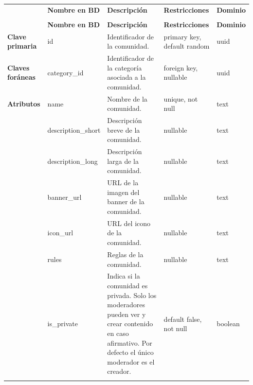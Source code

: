 \begin{longtable}{|
>{\raggedright\arraybackslash}p{1.9cm}|
>{\raggedright\arraybackslash}p{2.7cm}|
>{\raggedright\arraybackslash}p{4.9cm}|
>{\raggedright\arraybackslash}p{2.7cm}|
>{\raggedright\arraybackslash}p{2.1cm}|
}
\hline

\rowcolor[gray]{0.75}
\multicolumn{5}{|c|}{\textbf{Comunidades}} \\
\hline

 & \textbf{Nombre en BD} & \textbf{Descripción} & \textbf{Restricciones} & \textbf{Dominio} \\
\hline
\endfirsthead

\hline
\rowcolor[gray]{0.75}
\multicolumn{5}{|c|}{\textbf{Comunidades}} \\
\hline

 & \textbf{Nombre en BD} & \textbf{Descripción} & \textbf{Restricciones} & \textbf{Dominio} \\
\hline
\endhead

\textbf{Clave primaria}
& id
& Identificador de la comunidad.
& primary key, default random
& uuid \\
\hline

\textbf{Claves foráneas}
& category\_\allowbreak id
& Identificador de la categoría asociada a la comunidad.
& foreign key, nullable
& uuid \\
\hline

\textbf{Atributos}
& name
& Nombre de la comunidad.
& unique, not null
& text \\
\cline{2-5}

& description\_\allowbreak short
& Descripción breve de la comunidad.
& nullable
& text \\
\cline{2-5}

& description\_\allowbreak long
& Descripción larga de la comunidad.
& nullable
& text \\
\cline{2-5}

& banner\_\allowbreak url
& URL de la imagen del banner de la comunidad.
& nullable
& text \\
\cline{2-5}

& icon\_\allowbreak url
& URL del icono de la comunidad.
& nullable
& text \\
\cline{2-5}

& rules
& Reglas de la comunidad.
& nullable
& text \\
\cline{2-5}

& is\_\allowbreak private
& Indica si la comunidad es privada. Solo los moderadores pueden ver y crear contenido en caso afirmativo. Por defecto el único moderador es el creador. 
& default false, not null
& boolean \\
\cline{2-5}


\end{longtable}
